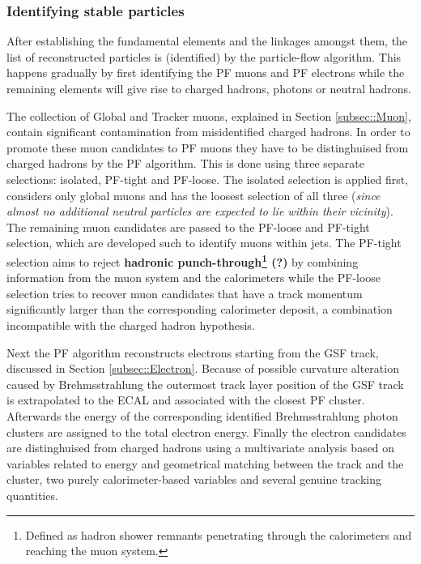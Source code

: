 \subsubsection*{Identifying stable particles}
After establishing the fundamental elements and the linkages amongst them, the list of reconstructed particles is (identified) by the particle-flow algorithm. This happens gradually by first identifying the PF muons and PF electrons while the remaining elements will give rise to charged hadrons, photons or neutral hadrons.

The collection of Global and Tracker muons, explained in Section \ref{subsec::Muon}, contain significant contamination from misidentified charged hadrons. In order to promote these muon candidates to PF muons they have to be distinghuised from charged hadrons by the PF algorithm. This is done using three separate selections: isolated, PF-tight and PF-loose. The isolated selection is applied first, considers only global muons and has the loosest selection of all three (\textit{since almost no additional neutral particles are expected to lie within their vicinity}). The remaining muon candidates are passed to the PF-loose and PF-tight selection, which are developed such to identify muons within jets. The PF-tight selection aims to reject \textbf{hadronic punch-through\footnote{Defined as hadron shower remnants penetrating through the calorimeters and reaching the muon system.} (?)} by combining information from the muon system and the calorimeters while the PF-loose selection tries to recover muon candidates that have a track momentum significantly larger than the corresponding calorimeter deposit, a combination incompatible with the charged hadron hypothesis.

Next the PF algorithm reconstructs electrons starting from the GSF track, discussed in Section \ref{subsec::Electron}. Because of possible curvature alteration caused by Brehmsstrahlung the outermost track layer position of the GSF track is extrapolated to the ECAL and associated with the closest PF cluster. Afterwards the energy of the corresponding identified Brehmsstrahlung photon clusters are assigned to the total electron energy. Finally the electron candidates are distinghuised from charged hadrons using a multivariate analysis based on variables related to energy and geometrical matching between the track and the cluster, two purely calorimeter-based variables and several genuine tracking quantities.

